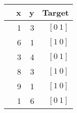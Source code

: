 \begin{tabular}{rrrr}
\toprule
  & x & y & Target  \\
\midrule
  & 1  & 3  & \([0 \   1]\)      \\
 & 6  & 1  & \([1 \   0]\)     \\
 & 3  & 4  & \([0 \   1]\)      \\
 & 8  & 3  & \([1 \   0]\)     \\
 & 9  & 1  & \([1 \   0]\)     \\
 & 1  & 6  & \([0 \   1]\) 	\\     
\bottomrule
\end{tabular}
